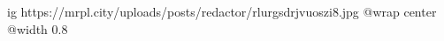  
 
 
 
 

\ifcmt
  ig https://mrpl.city/uploads/posts/redactor/rlurgsdrjvuoszi8.jpg
  @wrap center
  @width 0.8
\fi
